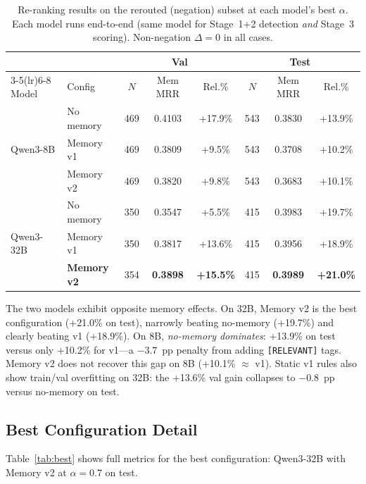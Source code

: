 \documentclass[11pt]{article}
\begin{document}
\begin{table}[h]
\centering
\caption{Re-ranking results on the rerouted (negation) subset at each model's best $\alpha$. Each model runs end-to-end (same model for Stage~1+2 detection \emph{and} Stage~3 scoring). Non-negation $\Delta=0$ in all cases.}
\label{tab:main}
\small
\begin{tabular}{ll ccc | ccc}
\toprule
 & & \multicolumn{3}{c}{\textbf{Val}} & \multicolumn{3}{c}{\textbf{Test}} \\
\cmidrule(lr){3-5}\cmidrule(lr){6-8}
Model & Config & $N$ & Mem MRR & Rel.\% & $N$ & Mem MRR & Rel.\% \\
\midrule
\multirow{3}{*}{Qwen3-8B}
 & No memory          & 469 & 0.4103 & +17.9\%  & 543 & 0.3830 & +13.9\% \\
 & Memory v1          & 469 & 0.3809 & +9.5\%   & 543 & 0.3708 & +10.2\% \\
 & Memory v2          & 469 & 0.3820 & +9.8\%   & 543 & 0.3683 & +10.1\% \\
\midrule
\multirow{3}{*}{Qwen3-32B}
 & No memory          & 350 & 0.3547 & +5.5\%   & 415 & 0.3983 & +19.7\% \\
 & Memory v1          & 350 & 0.3817 & +13.6\%  & 415 & 0.3956 & +18.9\% \\
 & \textbf{Memory v2} & 354 & \textbf{0.3898} & \textbf{+15.5\%} & 415 & \textbf{0.3989} & \textbf{+21.0\%} \\
\bottomrule
\end{tabular}
\end{table}

The two models exhibit opposite memory effects. On 32B, Memory v2 is the best configuration (+21.0\% on test), narrowly beating no-memory (+19.7\%) and clearly beating v1 (+18.9\%). On 8B, \emph{no-memory dominates}: +13.9\% on test versus only +10.2\% for v1---a $-3.7$~pp penalty from adding \texttt{[RELEVANT]} tags. Memory v2 does not recover this gap on 8B (+10.1\% $\approx$ v1). Static v1 rules also show train/val overfitting on 32B: the +13.6\% val gain collapses to $-0.8$~pp versus no-memory on test.

\subsection{Best Configuration Detail}

Table~\ref{tab:best} shows full metrics for the best configuration: Qwen3-32B with Memory v2 at $\alpha=0.7$ on test.
\end{document}
